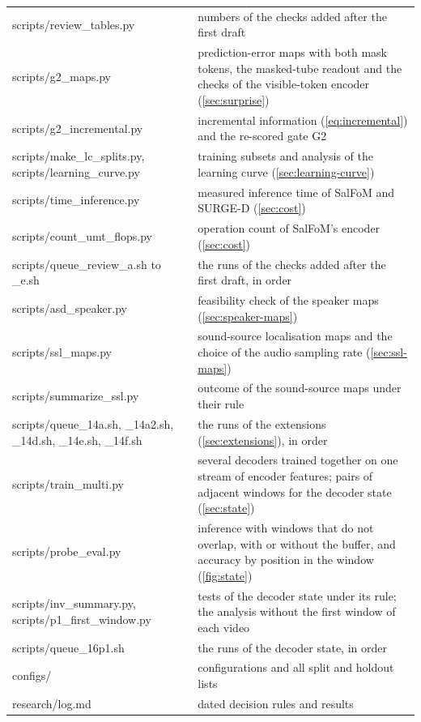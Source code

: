 \begin{table}[htbp]
\begin{tabularx}{\textwidth}{@{}>{\ttfamily\raggedright}p{6.2cm}>{\raggedright\arraybackslash}X@{}}
    scripts/review\_tables.py & numbers of the checks added after the first draft \\
    scripts/g2\_maps.py & prediction-error maps with both mask tokens, the masked-tube readout and the checks of the visible-token encoder (\cref{sec:surprise}) \\
    scripts/g2\_incremental.py & incremental information (\cref{eq:incremental}) and the re-scored gate G2 \\
    scripts/make\_lc\_splits.py, scripts/learning\_curve.py & training subsets and analysis of the learning curve (\cref{sec:learning-curve}) \\
    scripts/time\_inference.py & measured inference time of SalFoM and SURGE-D (\cref{sec:cost}) \\
    scripts/count\_umt\_flops.py & operation count of SalFoM's encoder (\cref{sec:cost}) \\
    scripts/queue\_review\_a.sh to \_e.sh & the runs of the checks added after the first draft, in order \\
    scripts/asd\_speaker.py & feasibility check of the speaker maps (\cref{sec:speaker-maps}) \\
    scripts/ssl\_maps.py & sound-source localisation maps and the choice of the audio sampling rate (\cref{sec:ssl-maps}) \\
    scripts/summarize\_ssl.py & outcome of the sound-source maps under their rule \\
    scripts/queue\_14a.sh, \_14a2.sh, \_14d.sh, \_14e.sh, \_14f.sh & the runs of the extensions (\cref{sec:extensions}), in order \\
    scripts/train\_multi.py & several decoders trained together on one stream of encoder features; pairs of adjacent windows for the decoder state (\cref{sec:state}) \\
    scripts/probe\_eval.py & inference with windows that do not overlap, with or without the buffer, and accuracy by position in the window (\cref{fig:state}) \\
    scripts/inv\_summary.py, scripts/p1\_first\_window.py & tests of the decoder state under its rule; the analysis without the first window of each video \\
    scripts/queue\_16p1.sh & the runs of the decoder state, in order \\
    configs/ & configurations and all split and holdout lists \\
    research/log.md & dated decision rules and results \\
    \bottomrule
  \end{tabularx}
\end{table}

